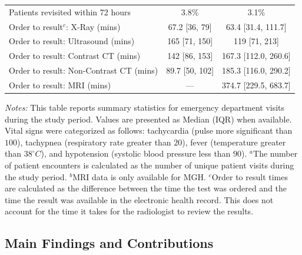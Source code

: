 \documentclass[,,blindrev]{informs}
\begin{document}
\begin{table}[t!]
\begin{threeparttable}
\begin{tabular}{p{9cm}cc}
Patients revisited within 72 hours & 3.8\% & 3.1\% \\
Order to result$^{c}$: X-Ray (mins) & 67.2 [36, 79] & 63.4 [31.4, 111.7] \\
Order to result: Ultrasound (mins) & 165 [71, 150] & 119 [71, 213] \\
Order to result: Contrast CT (mins) & 142 [86, 153] & 167.3 [112.0, 260.6] \\
Order to result: Non-Contrast CT (mins) & 89.7 [50, 102] & 185.3 [116.0, 290.2] \\
Order to result: MRI (mins) & --- & 374.7 [229.5, 683.7] \\
\bottomrule
\end{tabular}
\begin{flushleft}
\footnotesize \textit{Notes:} This table reports summary statistics for emergency department visits during the study period. Values are presented as Median (IQR) when available. Vital signs were categorized as follows: tachycardia (pulse more significant than $100$), tachypnea (respiratory rate greater than $20$), fever (temperature greater than $38^\circ C$), and hypotension (systolic blood pressure less than $90$).
\footnotesize $^a$The number of patient encounters is calculated as the number of unique patient visits during the study period.
\footnotesize $^b$MRI data is only available for MGH.
\footnotesize $^c$Order to result times are calculated as the difference between the time the test was ordered and the time the result was available in the electronic health record. This does not account for the time it takes for the radiologist to review the results.
\end{flushleft}
\end{threeparttable}
\end{table}

\subsection{Main Findings and Contributions}\label{sec:contributions}
\end{document}

